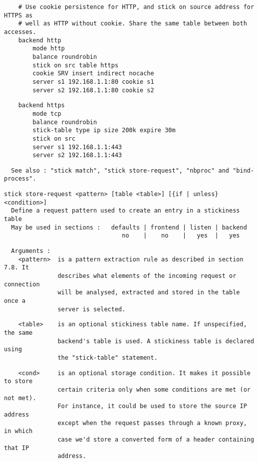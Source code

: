 \begin{verbatim}
    # Use cookie persistence for HTTP, and stick on source address for HTTPS as
    # well as HTTP without cookie. Share the same table between both accesses.
    backend http
        mode http
        balance roundrobin
        stick on src table https
        cookie SRV insert indirect nocache
        server s1 192.168.1.1:80 cookie s1
        server s2 192.168.1.1:80 cookie s2
\end{verbatim}

\begin{verbatim}
    backend https
        mode tcp
        balance roundrobin
        stick-table type ip size 200k expire 30m
        stick on src
        server s1 192.168.1.1:443
        server s2 192.168.1.1:443
\end{verbatim}

\begin{verbatim}
  See also : "stick match", "stick store-request", "nbproc" and "bind-process".
\end{verbatim}

\begin{verbatim}
stick store-request <pattern> [table <table>] [{if | unless} <condition>]
  Define a request pattern used to create an entry in a stickiness table
  May be used in sections :   defaults | frontend | listen | backend
                                 no    |    no    |   yes  |   yes
\end{verbatim}

\begin{verbatim}
  Arguments :
    <pattern>  is a pattern extraction rule as described in section 7.8. It
               describes what elements of the incoming request or connection
               will be analysed, extracted and stored in the table once a
               server is selected.
\end{verbatim}

\begin{verbatim}
    <table>    is an optional stickiness table name. If unspecified, the same
               backend's table is used. A stickiness table is declared using
               the "stick-table" statement.
\end{verbatim}

\begin{verbatim}
    <cond>     is an optional storage condition. It makes it possible to store
               certain criteria only when some conditions are met (or not met).
               For instance, it could be used to store the source IP address
               except when the request passes through a known proxy, in which
               case we'd store a converted form of a header containing that IP
               address.
\end{verbatim}

